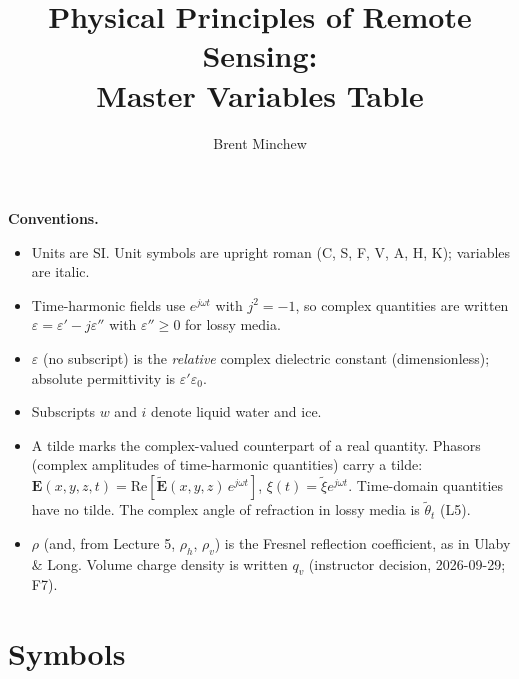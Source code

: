 \documentclass[11pt, oneside]{article}
\title{Physical Principles of Remote Sensing:\\Master Variables Table}
\author{Brent Minchew}
\date{}
\begin{document}
\maketitle

\noindent\textbf{Conventions.}
\begin{itemize}
	\item Units are SI. Unit symbols are upright roman (C, S, F, V, A, H, K); variables are italic.
	\item Time-harmonic fields use $e^{j\omega t}$ with $j^2=-1$, so complex quantities are written $\varepsilon = \varepsilon' - j\varepsilon''$ with $\varepsilon'' \ge 0$ for lossy media.
	\item $\varepsilon$ (no subscript) is the \emph{relative} complex dielectric constant (dimensionless); absolute permittivity is $\varepsilon'\varepsilon_0$.
	\item Subscripts $w$ and $i$ denote liquid water and ice.
	\item A tilde marks the complex-valued counterpart of a real quantity. Phasors (complex amplitudes of time-harmonic quantities) carry a tilde: $\mathbf{E}(x,y,z,t) = \mathrm{Re}[\tilde{\mathbf{E}}(x,y,z)\,e^{j\omega t}]$, $\xi(t) = \tilde{\xi}e^{j\omega t}$. Time-domain quantities have no tilde. The complex angle of refraction in lossy media is $\tilde{\theta}_t$ (L5).
	\item $\rho$ (and, from Lecture 5, $\rho_h$, $\rho_v$) is the Fresnel reflection coefficient, as in Ulaby \& Long. Volume charge density is written $q_v$ (instructor decision, 2026-09-29; F7).
\end{itemize}

\section{Symbols}
\end{document}
